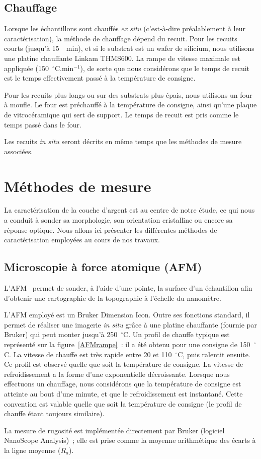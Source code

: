 	\subsection{Chauffage}
Lorsque les échantillons sont chauffés \textit{ex situ} (c'est-à-dire préalablement à leur caractérisation), la méthode de chauffage dépend du recuit. Pour les recuits courts (jusqu'à 15~~min), et si le substrat est un wafer de silicium, nous utilisons une platine chauffante Linkam THMS600. La rampe de vitesse maximale est appliquée (150~$^\circ$C.min$^{-1}$), de sorte que nous considérons que le temps de recuit est le temps effectivement passé à la température de consigne.\par 
Pour les recuits plus longs ou sur des substrats plus épais, nous utilisons un four à moufle. Le four est préchauffé à la température de consigne, ainsi qu'une plaque de vitrocéramique qui sert de support. Le temps de recuit est pris comme le temps passé dans le four.\par 
Les recuits \textit{in situ} seront décrits en même temps que les méthodes de mesure associées.\par 

\section{Méthodes de mesure}
\label{sMethodeMesure}
La caractérisation de la couche d'argent est au centre de notre étude, ce qui nous a conduit à sonder sa morphologie, son orientation cristalline ou encore sa réponse optique. Nous allons ici présenter les différentes méthodes de caractérisation employées au cours de nos travaux.\par 
	\subsection{Microscopie à force atomique (AFM)}
L'AFM~\cite{binnig1986atomic} permet de sonder, à l'aide d'une pointe, la surface d'un échantillon afin d'obtenir une cartographie de la topographie à l'échelle du nanomètre.\par 
L'AFM employé est un Bruker Dimension Icon. Outre ses fonctions standard, il permet de réaliser une imagerie \textit{in situ} grâce à une platine chauffante (fournie par Bruker) qui peut monter jusqu'à 250~$^\circ$C. Un profil de chauffe typique est représenté sur la figure~\ref{AFMrampe}~: il a été obtenu pour une consigne de 150~$^\circ$C. La vitesse de chauffe est très rapide entre 20 et 110~$^\circ$C, puis ralentit ensuite. Ce profil est observé quelle que soit la température de consigne. La vitesse de refroidissement a la forme d'une exponentielle décroissante. Lorsque nous effectuons un chauffage, nous considérons que la température de consigne est atteinte au bout d'une minute, et que le refroidissement est instantané. Cette convention est valable quelle que soit la température de consigne (le profil de chauffe étant toujours similaire).\par 
La mesure de rugosité est implémentée directement par Bruker (logiciel NanoScope Analysis)~; elle est prise comme la moyenne arithmétique des écarts à la ligne moyenne ($R_a$).\par 

